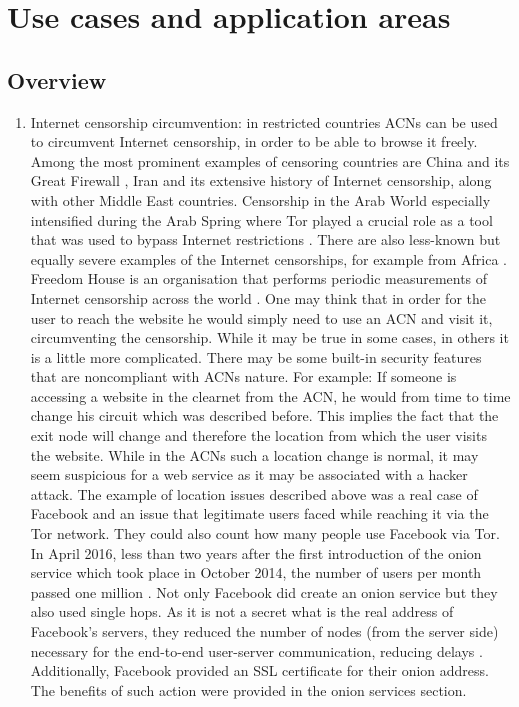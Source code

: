 \chapter{Use cases and application areas}

\section{Overview}
\begin{enumerate}
    \item Internet censorship circumvention: in restricted countries ACNs can be used to circumvent Internet censorship, in order to be able to browse it freely. Among the most prominent examples of censoring countries are China and its Great Firewall \cite{gfw-china}, Iran and its extensive history of Internet censorship, along with other Middle East countries. Censorship in the Arab World especially intensified during the Arab Spring where Tor played a crucial role as a tool that was used to bypass Internet restrictions \cite{arab-spring}. There are also less-known but equally severe examples of the Internet censorships, for example from Africa \cite{africa}. Freedom House is an organisation that performs periodic measurements of Internet censorship across the world \cite{freedomhouse_internet}.
    One may think that in order for the user to reach the website he would simply need to use an ACN and visit it, circumventing the censorship. While it may be true in some cases, in others it is a little more complicated. There may be some built-in security features that are noncompliant with ACNs nature. For example: If someone is accessing a website in the clearnet from the ACN, he would from time to time change his circuit which was described before. This implies the fact that the exit node will change and therefore the location from which the user visits the website. While in the ACNs such a location change is normal, it may seem suspicious for a web service as it may be associated with a hacker attack.
    The example of location issues described above was a real case of Facebook and an issue that legitimate users faced while reaching it via the Tor network. They could also count how many people use Facebook via Tor. In April 2016, less than two years after the first introduction of the onion service which took place in October 2014, the number of users per month passed one million \cite{facebook-tor-note}. Not only Facebook did create an onion service but they also used single hops. As it is not a secret what is the real address of Facebook's servers, they reduced the number of nodes (from the server side) necessary for the end-to-end user-server communication, reducing delays \cite{facebook-tor}. Additionally, Facebook provided an SSL certificate for their onion address. The benefits of such action were provided in the onion services section.

\end{enumerate}
